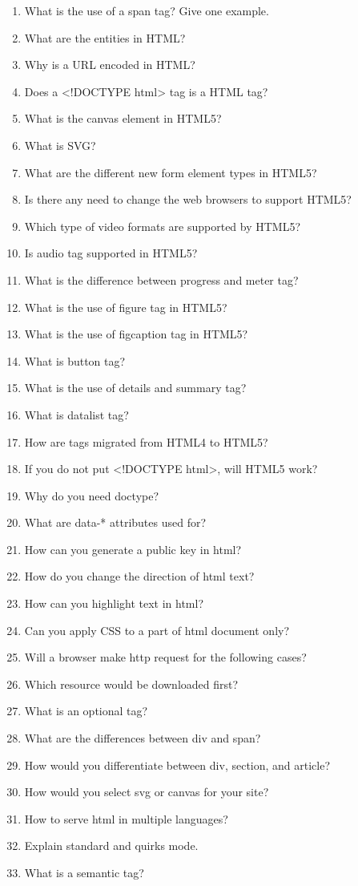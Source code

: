 \documentclass[11pt]{article}
\begin{document}
\begin{enumerate}
\item What is the use of a span tag? Give one example.
\item What are the entities in HTML?
\item Why is a URL encoded in HTML?
\item Does a <!DOCTYPE html> tag is a HTML tag?
\item What is the canvas element in HTML5?
\item What is SVG?
\item What are the different new form element types in HTML5?
\item Is there any need to change the web browsers to support HTML5?
\item Which type of video formats are supported by HTML5?
\item Is audio tag supported in HTML5?
\item What is the difference between progress and meter tag?
\item What is the use of figure tag in HTML5?
\item What is the use of figcaption tag in HTML5?
\item What is button tag?
\item What is the use of details and summary tag?
\item What is datalist tag?
\item How are tags migrated from HTML4 to HTML5?
\item If you do not put <!DOCTYPE html>, will HTML5 work?
\item Why do you need doctype?
\item What are data-* attributes used for?
\item How can you generate a public key in html?
\item How do you change the direction of html text?
\item How can you highlight text in html?
\item Can you apply CSS to a part of html document only?
\item Will a browser make http request for the following cases?
\item Which resource would be downloaded first?
\item What is an optional tag?
\item What are the differences between div and span?
\item How would you differentiate between div, section, and article?
\item How would you select svg or canvas for your site?
\item How to serve html in multiple languages?
\item Explain standard and quirks mode.
\item What is a semantic tag?
\end{enumerate}
\end{document}
